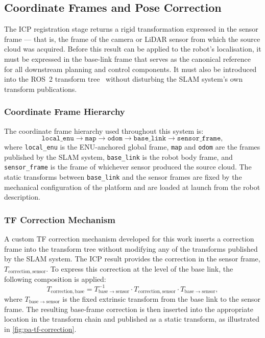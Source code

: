 \subsection{Coordinate Frames and Pose Correction}
\label{subsec:pa-pose-correction}

The ICP registration stage returns a rigid transformation expressed in the sensor frame --- that is, the frame of the camera or LiDAR sensor from which the source cloud was acquired. Before this result can be applied to the robot's localisation, it must be expressed in the base-link frame that serves as the canonical reference for all downstream planning and control components. It must also be introduced into the ROS~2 transform tree~\cite{macenskiRobotOperatingSystem2022} without disturbing the SLAM system's own transform publications.

\subsubsection*{Coordinate Frame Hierarchy}

The coordinate frame hierarchy used throughout this system is:
\[
  \texttt{local\_enu} \to \texttt{map} \to \texttt{odom} \to \texttt{base\_link} \to \texttt{sensor\_frame},
\]
where \texttt{local\_enu} is the ENU-anchored global frame, \texttt{map} and \texttt{odom} are the frames published by the SLAM system, \texttt{base\_link} is the robot body frame, and \texttt{sensor\_frame} is the frame of whichever sensor produced the source cloud. The static transforms between \texttt{base\_link} and the sensor frames are fixed by the mechanical configuration of the platform and are loaded at launch from the robot description.

\subsubsection*{TF Correction Mechanism}

A custom TF correction mechanism developed for this work inserts a correction frame into the transform tree without modifying any of the transforms published by the SLAM system. The ICP result provides the correction in the sensor frame, $T_{\mathrm{correction, sensor}}$. To express this correction at the level of the base link, the following composition is applied:
%
\begin{equation}
    T_{\mathrm{correction, base}} =
        T_{\mathrm{base} \to \mathrm{sensor}}^{-1}
        \cdot T_{\mathrm{correction, sensor}}
        \cdot T_{\mathrm{base} \to \mathrm{sensor}},
    \label{eq:tf-correction}
\end{equation}
%
where $T_{\mathrm{base} \to \mathrm{sensor}}$ is the fixed extrinsic transform from the base link to the sensor frame. The resulting base-frame correction is then inserted into the appropriate location in the transform chain and published as a static transform, as illustrated in \cref{fig:pa-tf-correction}.


